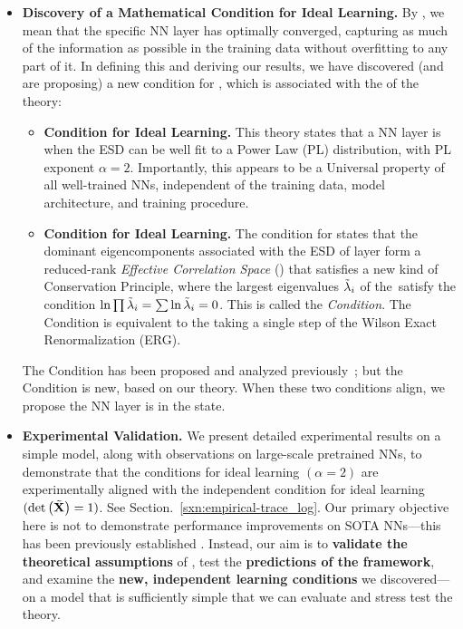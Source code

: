 \begin{itemize}
   \item 
     \textbf{Discovery of a Mathematical Condition for Ideal Learning.}
     By \IdealLearning, we mean that the specific NN layer has optimally converged, capturing as
     much of the information as possible in the training data without overfitting to any part of it.
     In defining this and deriving our results, we have discovered (and are proposing) a new condition
     for \IdealLearning, which is associated with the \Universality of the \HTSR theory:
   \begin{itemize}
      \item 
        \textbf{\HTSR Condition for Ideal Learning.}
        This \HTSR theory states that a NN layer is \Ideal  when the ESD can be well fit to a
        Power Law (PL) distribution, with PL exponent $\alpha = 2$. Importantly, 
        this appears to be a Universal property of all well-trained NNs, independent of the training data,
        model architecture, and training procedure.
      \item 
        \textbf{\SETOL \TRACELOG Condition for Ideal Learning.}
        The \SETOL condition for \IdealLearning states that the 
        dominant eigencomponents associated with the ESD 
        of layer form a reduced-rank \emph{Effective Correlation Space} (\ECS) that satisfies
        a new kind of Conservation Principle,  \emph{\ScaleInvariant} \emph{\VolumePreservingTransformation} where the largest eigenvalues $\tilde{\lambda}_{i}$ of the~\ECS satisfy
        the condition  $\ln \prod \tilde{\lambda}_{i} = \sum \ln \tilde{\lambda}_{i} = 0$.  
        This is called the \emph{\TRACELOG Condition}.  The \TRACELOG Condition is equivalent to the taking a single step of the Wilson Exact Renormalization (ERG).
   \end{itemize}

   The \HTSR Condition has been proposed and analyzed previously~\cite{MM18_TR_JMLRversion,MM20a_trends_NatComm,YTHx23_KDD}; but
   the \TRACELOG Condition is new, based on our \SETOL theory.
   When these two conditions align, we propose the NN layer is in the \Ideal state.

   \item 
   \textbf{Experimental Validation.} 
   We present detailed experimental results on a simple model, along with observations on large-scale pretrained NNs, to demonstrate that the \HTSR conditions for ideal learning $(\alpha = 2)$ are experimentally aligned with the independent \SETOL condition for ideal learning
   $(\mbox{}{\text{det}}\left(\tilde{\mathbf{X}}\right)=1)$. 
   See Section.~\ref{sxn:empirical-trace_log}.
   Our primary objective here is not to demonstrate performance improvements on SOTA NNs---this has been previously established \cite{NEURIPS2023_CHM}. 
   Instead, our aim is to \textbf{validate the theoretical assumptions} of \SETOL, test the \textbf{predictions of the \SETOL framework}, and examine the \textbf{new, independent learning conditions} we discovered---on a model that is sufficiently simple that we can evaluate and stress test the theory.


\end{itemize}

